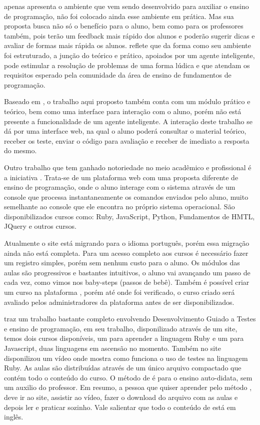 \documentclass[pnumabnt,normaltoc,espacoumemeio,capchap]{abnt}
\begin{document}
\par {} apenas apresenta o ambiente que vem sendo desenvolvido para auxiliar o ensino de programação, não foi colocado ainda esse ambiente em prática. Mas sua proposta busca não só o benefício para o aluno, bem como para os professores também, pois terão um feedback mais rápido dos alunos e poderão sugerir dicas e avaliar de formas mais rápida os alunos.  reflete que da forma como seu ambiente foi estruturado, a junção do teórico e prático, apoiados por um agente inteligente, pode estimular a resolução de problemas de uma forma lúdica e que atendam os requisitos esperado pela comunidade da área de ensino de fundamentos de programação.
\par Baseado em , o trabalho aqui proposto também conta com um módulo prático e teórico, bem como uma interface para interação com o aluno, porém não está presente a funcionalidade de um agente inteligente. A interação deste trabalho se dá por uma interface web, na qual o aluno poderá consultar o material teórico, receber os teste, enviar o código para avaliação e receber de imediato a resposta do mesmo.
\par Outro trabalho que tem ganhado notoriedade no meio acadêmico e profissional é a iniciativa . Trata-se de um plataforma web com uma proposta diferente de ensino de programação, onde o aluno interage com o sistema através de um console que processa instantaneamente os comandos enviados pelo aluno, muito semelhante ao console que ele encontra no próprio sistema operacional. São disponibilizados cursos como: Ruby, JavaScript, Python, Fundamentos de HMTL, JQuery e outros cursos. \par Atualmente o site está migrando para o idioma português, porém essa migração ainda não está completa. Para um acesso completo aos cursos é necessário fazer um registro simples, porém sem nenhum custo para o aluno. Os módulos das aulas são progressivos e bastantes intuitivos, o aluno vai avançando um passo de cada vez, como vimos nos baby-steps (passos de bebê). Também é possível criar um curso na plataforma , porém até onde foi verificado, o curso criado será avaliado pelos administradores da plataforma antes de ser disponibilizados.
\par {} traz um trabalho bastante completo envolvendo Desenvolvimento Guiado a Testes e ensino de programação, em seu trabalho, disponilizado através de um site, temos dois cursos disponíveis, um para aprender a linguagem Ruby e um para Javascript, duas linguagens em ascensão no momento. Também no site  disponilizou um vídeo onde mostra como funciona o uso de testes na linguagem Ruby. As aulas são distribuídas através de um único arquivo compactado que contém todo o conteúdo do curso. O método de  é para o ensino auto-didata, sem um auxilio do professor. Em resumo, a pessoa que quiser aprender pelo método , deve ir ao site, assistir ao vídeo, fazer o download do arquivo com as aulas e depois ler e praticar sozinho. Vale salientar que todo o conteúdo de  está em inglês.
\end{document}
